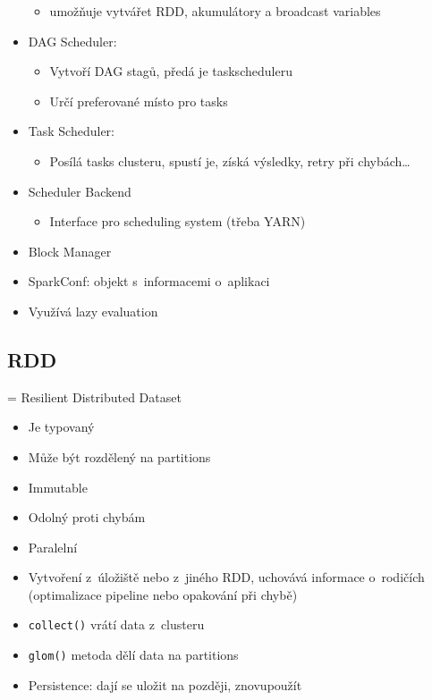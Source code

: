 \begin{itemize}
\begin{itemize}
        \item umožňuje vytvářet RDD, akumulátory a broadcast variables
    \end{itemize}
    \item DAG Scheduler:
    \begin{itemize}
        \item Vytvoří DAG stagů, předá je taskscheduleru
        \item Určí preferované místo pro tasks
    \end{itemize}
    \item Task Scheduler:
    \begin{itemize}
        \item Posílá tasks clusteru, spustí je, získá výsledky, retry při chybách\dots
    \end{itemize}
    \item Scheduler Backend
    \begin{itemize}
        \item Interface pro scheduling system (třeba YARN)
    \end{itemize}
    \item Block Manager
    \item SparkConf: objekt s~informacemi o~aplikaci
    \item Využívá lazy evaluation
\end{itemize}

\subsection{RDD}
= Resilient Distributed Dataset
\begin{itemize}
    \item Je typovaný
    \item Může být rozdělený na partitions
    \item Immutable
    \item Odolný proti chybám
    \item Paralelní
    \item Vytvoření z~úložiště nebo z~jiného RDD, uchovává informace o~rodičích (optimalizace pipeline nebo opakování při chybě)
    \item \texttt{collect()} vrátí data z~clusteru
    \item \texttt{glom()} metoda dělí data na partitions
    \item Persistence: dají se uložit na později, znovupoužít
\end{itemize}

